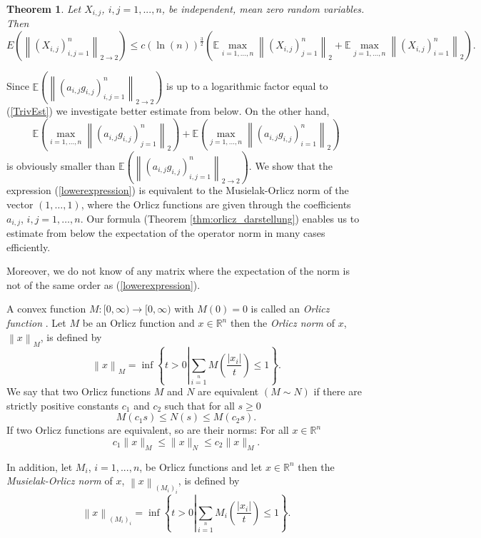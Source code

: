 \documentclass[12pt,a4paper]{article}
\newtheorem{satz}{Theorem}[section]
\newcommand{\R}{\ensuremath{{\mathbb R}}}
\newcommand{\Ex}{\mathbb{E}}
\newcommand{\norm}[1]{\left \lVert#1 \right\rVert}
\begin{document}
\begin{satz}\label{thm:allgemein_1} Let $X_{i,j}$, $i,j=1,...,n$, be independent, mean zero random variables. Then
$$
E\left(\norm{(X_{i,j})_{i,j=1}^n}_{2\rightarrow 2}\right)
\leq c\left(\ln(n)\right)^{\frac{3}{2}}\left(\Ex\max\limits_{i=1,...,n}\norm{(X_{i,j})_{j=1}^n}_2+\Ex\max\limits_{j=1,...,n}\norm{(X_{i,j})_{i=1}^n}_2\right).$$
\end{satz}
Since
$\Ex\left(\norm{(a_{i,j}g_{i,j})_{i,j=1}^n}_{2\rightarrow 2}\right)$
is up to a logarithmic factor equal to (\ref{TrivEst}) we investigate better estimate
from below.
On the other hand, 
\begin{equation}\label{lowerexpression}
\Ex\left(\max\limits_{i=1,...,n}\norm{(a_{i,j}g_{i,j})_{j=1}^n}_2\right)+\Ex\left(\max\limits_{j=1,...,n}\norm{(a_{i,j}g_{i,j})_{i=1}^n}_2\right)
\end{equation}
is obviously smaller than 
$\Ex\left(\norm{(a_{i,j}g_{i,j})_{i,j=1}^n}_{2\rightarrow 2}\right)$.
We show that the expression (\ref{lowerexpression}) is equivalent 
to the Musielak-Orlicz norm of the 
vector $(1,\dots,1)$, where the Orlicz functions are given through the
coefficients $a_{i,j}$, $i,j=1,\dots,n$. Our formula (Theorem \ref{thm:orlicz_darstellung}) enables us
to estimate from below the expectation of the operator norm in many cases efficiently.
\par
Moreover, we do not know of any matrix where the expectation of the norm
is not of the same order as (\ref{lowerexpression}).
\par
A convex function $M:[0,\infty)\rightarrow[0,\infty)$ with $M(0)=0$ is called an \textit{Orlicz function} \cite{RaRe}. Let $M$ be an Orlicz function and $x\in\R^n$ then the \textit{Orlicz norm} of $x$, $\norm{x}_M$, is defined by
	$$
\norm{x}_M
=\inf\left\{t>0\left|\sum\limits_{i=1}\limits^nM\left(\frac{|x_i|}{t}\right)\leq 1
\right.\right\}.
$$
	We say that two Orlicz functions $M$ and $N$ are equivalent 
	$(M\sim N)$ if there are
	strictly positive constants $c_{1}$ and $c_{2}$ such that for all $s\geq0$ 
	$$
	M(c_{1}s)\leq N(s)\leq M(c_{2}s).
	$$
	If two Orlicz functions are equivalent, so are their norms: For all 
	$x\in\mathbb R^{n}$
	$$
	c_{1}\|x\|_{M}\leq\|x\|_{N}\leq c_{2}\|x\|_{M}.
	$$
\par
	In addition, let $M_i$, $i=1,...,n$, be Orlicz functions and let $x\in\R^n$ then the \textit{Musielak-Orlicz norm} of $x$, $\norm{x}_{(M_i)_i}$, is defined by
	$$
	\norm{x}_{(M_i)_i}
	=\inf\left\{t>0\left|\sum\limits_{i=1}\limits^nM_i\left(\frac{|x_i|}{t}\right)\leq 1\right.\right\}.
	$$
	
\end{document}
